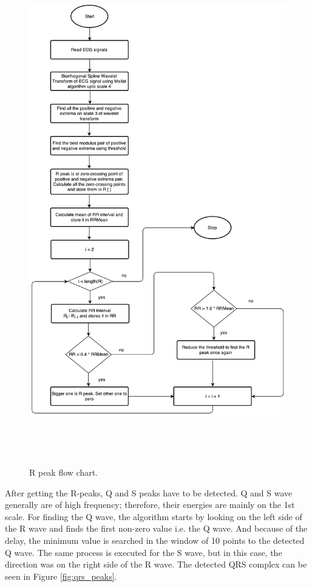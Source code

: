 \begin{figure}[htpb]
	\centering
	\includegraphics[width=25cm,height=22cm,keepaspectratio=true]{images/qrs.pdf}
	\caption{
		R peak flow chart.
	}
	\label{fig:r_peaks_flow_chart}
\end{figure}



After getting the R-peaks, Q and S peaks have to be detected. Q and S wave generally are of high frequency; therefore, their energies are mainly on the 1st scale. For finding the Q wave, the algorithm starts by looking on the left side of the R wave and finds the first non-zero value i.e. the Q wave. And because of the delay, the minimum value is searched in the window of 10 points to the detected Q wave. The same process is executed for the S wave, but in this case, the direction was on the right side of the R wave. The detected QRS complex can be seen in Figure \ref{fig:qrs_peaks}.

